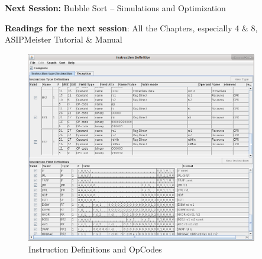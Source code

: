 \textbf{Next Session:} Bubble Sort -- Simulations and Optimization

\textbf{Readings for the next session}: All the Chapters, especially 4
\& 8, ASIPMeister Tutorial \& Manual

\begin{figure}
	\centering
	\includegraphics[width=0.9\textwidth]{src/images/image1.png}
	\caption{Instruction Definitions and OpCodes}
	\label{fig:fig1}
\end{figure}